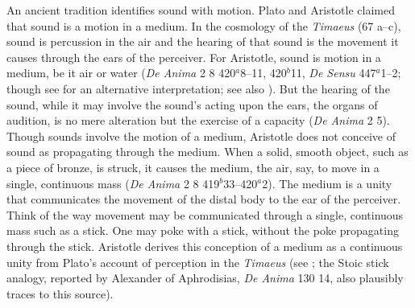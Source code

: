 An ancient tradition identifies sound with motion. Plato and Aristotle claimed that sound is a motion in a medium. In the cosmology of the \emph{Timaeus} (67 a--c), sound is percussion in the air and the hearing of that sound is the movement it causes through the ears of the perceiver. For Aristotle, sound is motion in a medium, be it air or water (\emph{De Anima} 2 8 420\( ^{a} \)8--11, 420\( ^{b} \)11, \emph{De Sensu} 447\( ^{a} \)1--2; though see \citealt[60--1]{OCallaghan:2007xy} for an alternative interpretation; see also \citealt{Johnstone:2013la}). But the hearing of the sound, while it may involve the sound's acting upon the ears, the organs of audition, is no mere alteration but the exercise of a capacity (\emph{De Anima} 2 5). Though sounds involve the motion of a medium, Aristotle does not conceive of sound as propagating through the medium. When a solid, smooth object, such as a piece of bronze, is struck, it causes the medium, the air, say, to move in a single, continuous mass (\emph{De Anima} 2 8 419\( ^{b} \)33--420\( ^{a} \)2). The medium is a unity that communicates the movement of the distal body to the ear of the perceiver. Think of the way movement may be communicated through a single, continuous mass such as a stick. One may poke with a stick, without the poke propagating through the stick. Aristotle derives this conception of a medium as a continuous unity from Plato's account of perception in the \emph{Timaeus} (see \citealt[chapter 1]{Lindberg:1977aa}; the Stoic stick analogy, reported by Alexander of Aphrodisias, \emph{De Anima} 130 14, also plausibly traces to this source). 

